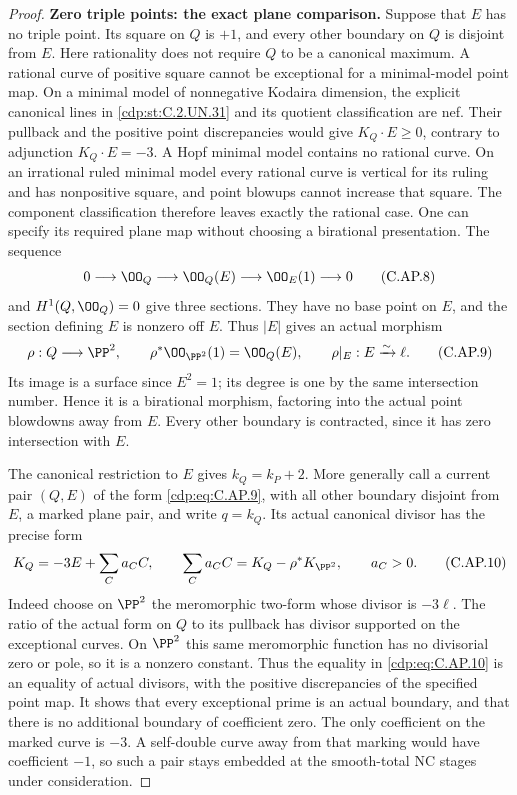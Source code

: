 \begin{proof}
\par\medskip\noindent\textbf{Zero triple points: the exact plane comparison.}
Suppose that \(E\) has no triple point. Its square on \(Q\)
is \(+1\), and every other boundary on \(Q\) is disjoint
from \(E\). Here rationality does not require \(Q\) to be
a canonical maximum. A rational curve of positive square
cannot be exceptional for a minimal-model point map. On a
minimal model of nonnegative Kodaira dimension, the explicit
canonical lines in \ref{cdp:st:C.2.UN.31} and its quotient classification are
nef. Their pullback and the positive point discrepancies
would give \(K_Q\cdot E\ge0\), contrary to adjunction
\(K_Q\cdot E=-3\). A Hopf minimal model contains no rational
curve. On an irrational ruled minimal model every rational
curve is vertical for its ruling and has nonpositive square,
and point blowups cannot increase that square. The component
classification therefore leaves exactly the rational case.
One can specify its required plane
map without choosing a birational presentation. The sequence
\[
 0\longrightarrow\OO_Q\longrightarrow\OO_Q(E)
       \longrightarrow\OO_E(1)\longrightarrow0
 \tag{C.AP.8}\label{cdp:eq:C.AP.8}
\]
and \(H^1(Q,\OO_Q)=0\) give three sections. They have no base
point on \(E\), and the section defining \(E\) is nonzero
off \(E\). Thus \(|E|\) gives an actual morphism
\[
 \rho:Q\longrightarrow\PP^2,
 \qquad \rho^*\OO_{\PP^2}(1)=\OO_Q(E),
 \qquad \rho|_E:E\xrightarrow{\sim}\ell .
 \tag{C.AP.9}\label{cdp:eq:C.AP.9}
\]
Its image is a surface since \(E^2=1\); its degree is one
by the same intersection number. Hence it is a birational
morphism, factoring into the actual point blowdowns away
from \(E\). Every other boundary is contracted, since it
has zero intersection with \(E\).

The canonical restriction to \(E\) gives
\(k_Q=k_P+2\). More generally call a current pair \((Q,E)\)
of the form \eqref{cdp:eq:C.AP.9}, with all other boundary disjoint from
\(E\), a marked plane pair, and write \(q=k_Q\). Its actual
canonical divisor has the precise form
\[
 K_Q=-3E+\sum_C a_CC,
 \qquad \sum_C a_CC=K_Q-\rho^*K_{\PP^2},
 \qquad a_C>0.
 \tag{C.AP.10}\label{cdp:eq:C.AP.10}
\]
Indeed choose on \(\PP^2\) the meromorphic two-form whose
divisor is \(-3\ell\). The ratio of the actual form on \(Q\)
to its pullback has divisor supported on the exceptional
curves. On \(\PP^2\) this same meromorphic function has no
divisorial zero or pole, so it is a nonzero constant. Thus
the equality in \eqref{cdp:eq:C.AP.10} is an equality of actual divisors,
with the positive discrepancies of the specified point map.
It shows that every exceptional prime is an actual
boundary, and that there is no additional boundary of
coefficient zero. The only coefficient on the marked curve
is \(-3\). A self-double curve away from that marking would
have coefficient \(-1\), so such a pair stays embedded at
the smooth-total NC stages under consideration.


\end{proof}
